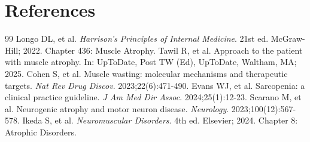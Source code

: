 \section*{References}

\begin{thebibliography}{99}
 Longo DL, et al. \emph{Harrison's Principles of Internal Medicine}. 21st ed. McGraw-Hill; 2022. Chapter 436: Muscle Atrophy.
 Tawil R, et al. Approach to the patient with muscle atrophy. In: UpToDate, Post TW (Ed), UpToDate, Waltham, MA; 2025.
 Cohen S, et al. Muscle wasting: molecular mechanisms and therapeutic targets. \emph{Nat Rev Drug Discov}. 2023;22(6):471-490.
 Evans WJ, et al. Sarcopenia: a clinical practice guideline. \emph{J Am Med Dir Assoc}. 2024;25(1):12-23.
 Scarano M, et al. Neurogenic atrophy and motor neuron disease. \emph{Neurology}. 2023;100(12):567-578.
 Ikeda S, et al. \emph{Neuromuscular Disorders}. 4th ed. Elsevier; 2024. Chapter 8: Atrophic Disorders.
\end{thebibliography}
